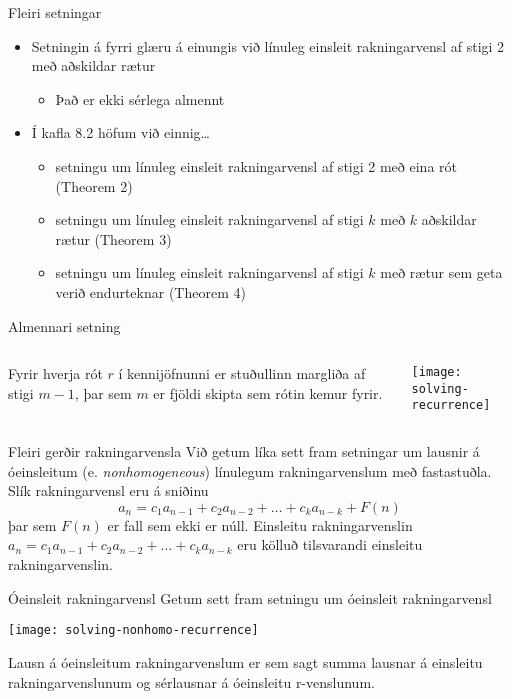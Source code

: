 \documentclass[handout]{beamer}
\begin{document}
\begin{frame}{Fleiri setningar}
\begin{itemize}
 \item Setningin á fyrri glæru á einungis við línuleg einsleit rakningarvensl af stigi 2 með aðskildar rætur
 \begin{itemize}
  \item Það er ekki sérlega almennt
 \end{itemize}
 \item Í kafla 8.2 höfum við einnig\ldots
 \begin{itemize}
  \item setningu um línuleg einsleit rakningarvensl af stigi 2 með eina rót (Theorem 2)
  \item setningu um línuleg einsleit rakningarvensl af stigi $k$ með $k$ aðskildar rætur (Theorem 3)
  \item setningu um línuleg einsleit rakningarvensl af stigi $k$ með rætur sem geta verið endurteknar (Theorem 4)
 \end{itemize}
\end{itemize}
\end{frame}

\begin{frame}{Almennari setning}
\begin{columns}
{\small
Fyrir hverja rót $r$ í kennijöfnunni er stuðullinn margliða af stigi $m - 1$, þar sem $m$ er fjöldi skipta sem rótin kemur fyrir.
}
\begin{center}
\texttt{[image: solving-recurrence]}
\end{center}
\end{columns}
\end{frame}

\begin{frame}{Fleiri gerðir rakningarvensla}
Við getum líka sett fram setningar um lausnir á óeinsleitum (e. \emph{nonhomogeneous}) línulegum rakningarvenslum með fastastuðla. Slík rakningarvensl eru á sniðinu 
\[
 a_n = c_1 a_{n-1} + c_2a_{n-2} + \ldots + c_ka_{n-k} + F(n)
\]
þar sem $F(n)$ er fall sem ekki er núll. Einsleitu rakningarvenslin $a_n = c_1 a_{n-1} + c_2a_{n-2} + \ldots + c_ka_{n-k}$ eru kölluð tilsvarandi einsleitu rakningarvenslin.
\end{frame}

\begin{frame}{Óeinsleit rakningarvensl}
Getum sett fram setningu um óeinsleit rakningarvensl
\begin{center}
\texttt{[image: solving-nonhomo-recurrence]}
\end{center}
Lausn á óeinsleitum rakningarvenslum er sem sagt summa lausnar á einsleitu rakningarvenslunum og sérlausnar á óeinsleitu r-venslunum.
\end{frame}
\end{document}
